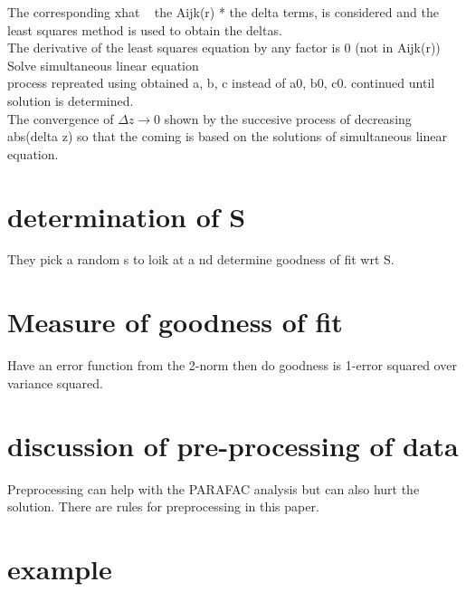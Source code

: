 \documentclass[10pt, draft]{article}
\begin{document}
 The corresponding xhat ~ the Aijk(r) * the delta terms, is considered and the least squares method is used to obtain the deltas.\\
 The derivative of the least squares equation by any factor is 0 (not in Aijk(r))\\
 Solve simultaneous linear equation\\
 process repreated using obtained a, b, c instead of a0, b0, c0.  continued until solution is determined.\\
 The convergence of $\Delta z \rightarrow 0$ shown by the succesive process of decreasing abs(delta z) so that the coming is based on the solutions of simultaneous linear equation.
 
 \section{determination of S}
 They pick a random s to loik at a nd determine goodness of fit wrt S.
 
 \section{Measure of goodness of fit}
 
 Have an error function from the 2-norm then do goodness is 1-error squared over variance squared.
 
 \section{discussion of pre-processing of data}
 
 Preprocessing can help with the PARAFAC analysis but can also hurt the solution.  There are rules for preprocessing in this paper.  
 
 \section{example}
 
\end{document}

